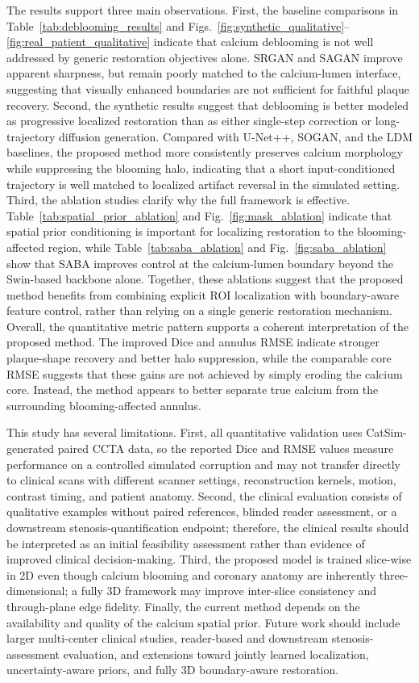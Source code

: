 \documentclass[singleLetter,times]{sagej}
\begin{document}
The results support three main observations. 
First, the baseline comparisons in Table~\ref{tab:deblooming_results} and Figs.~\ref{fig:synthetic_qualitative}--\ref{fig:real_patient_qualitative} indicate that calcium deblooming is not well addressed by generic restoration objectives alone. SRGAN and SAGAN improve apparent sharpness, but remain poorly matched to the calcium-lumen interface, suggesting that visually enhanced boundaries are not sufficient for faithful plaque recovery.  
Second, the synthetic results suggest that deblooming is better modeled as progressive localized restoration than as either single-step correction or long-trajectory diffusion generation. Compared with U-Net++, SOGAN, and the LDM baselines, the proposed method more consistently preserves calcium morphology while suppressing the blooming halo, indicating that a short input-conditioned trajectory is well matched to localized artifact reversal in the simulated setting. 
Third, the ablation studies clarify why the full framework is effective. Table~\ref{tab:spatial_prior_ablation} and Fig.~\ref{fig:mask_ablation} indicate that spatial prior conditioning is important for localizing restoration to the blooming-affected region, while Table~\ref{tab:saba_ablation} and Fig.~\ref{fig:saba_ablation} show that SABA improves control at the calcium-lumen boundary beyond the Swin-based backbone alone. Together, these ablations suggest that the proposed method benefits from combining explicit ROI localization with boundary-aware feature control, rather than relying on a single generic restoration mechanism.
Overall, the quantitative metric pattern supports a coherent interpretation of the proposed method. The improved Dice and annulus RMSE indicate stronger plaque-shape recovery and better halo suppression, while the comparable core RMSE suggests that these gains are not achieved by simply eroding the calcium core. Instead, the method appears to better separate true calcium from the surrounding blooming-affected annulus.

This study has several limitations. First, all quantitative validation uses CatSim-generated paired CCTA data, so the reported Dice and RMSE values measure performance on a controlled simulated corruption and may not transfer directly to clinical scans with different scanner settings, reconstruction kernels, motion, contrast timing, and patient anatomy. Second, the clinical evaluation consists of qualitative examples without paired references, blinded reader assessment, or a downstream stenosis-quantification endpoint; therefore, the clinical results should be interpreted as an initial feasibility assessment rather than evidence of improved clinical decision-making. Third, the proposed model is trained slice-wise in 2D even though calcium blooming and coronary anatomy are inherently three-dimensional; a fully 3D framework may improve inter-slice consistency and through-plane edge fidelity. Finally, the current method depends on the availability and quality of the calcium spatial prior. Future work should include larger multi-center clinical studies, reader-based and downstream stenosis-assessment evaluation, and extensions toward jointly learned localization, uncertainty-aware priors, and fully 3D boundary-aware restoration.
\end{document}
